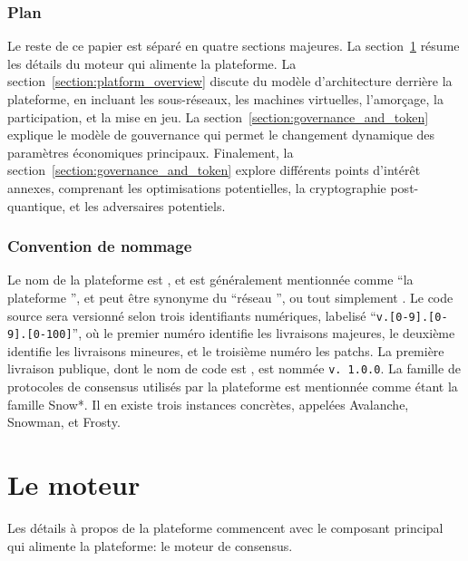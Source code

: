 \documentclass[runningheads]{llncs}
\begin{document}
\subsubsection{Plan}
Le reste de ce papier est séparé en quatre sections majeures. La section~\ref{section:engine} résume les détails du
moteur qui alimente la plateforme. La section~\ref{section:platform_overview} discute du modèle d'architecture derrière
la plateforme, en incluant les sous-réseaux, les machines virtuelles, l'amorçage, la participation, et la mise en jeu.
La section~\ref{section:governance_and_token} explique le modèle de gouvernance qui permet le changement dynamique des
paramètres économiques principaux. Finalement, la section~\ref{section:governance_and_token} explore différents points
d'intérêt annexes, comprenant les optimisations potentielles, la cryptographie post-quantique, et les adversaires
potentiels.

\subsubsection{Convention de nommage}
Le nom de la plateforme est \AVAPlatformName{}, et est généralement mentionnée comme
``la plateforme \AVAPlatformName{}'', et peut être synonyme du ``réseau \AVAPlatformName{}'', ou tout simplement
\AVAPlatformName{}. Le code source sera versionné selon trois identifiants numériques, labelisé
``\texttt{v.[0-9].[0-9].[0-100]}'', où le premier numéro identifie les livraisons majeures, le deuxième identifie les
livraisons mineures, et le troisième numéro les patchs. La première livraison publique, dont le nom de code est
\AVAPlatformNameFirstRelease{}, est nommée \texttt{v. 1.0.0}. La famille de protocoles de consensus utilisés par la
plateforme \AVAPlatformName{} est mentionnée comme étant la famille Snow*. Il en existe trois instances concrètes,
appelées Avalanche, Snowman, et Frosty.

\section{Le moteur}
\label{section:engine}
Les détails à propos de la plateforme \AVAPlatformName{} commencent avec le composant principal qui alimente la
plateforme: le moteur de consensus.
\end{document}
